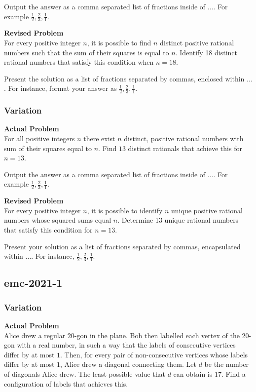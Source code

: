 Output the answer as a comma separated list of fractions inside of $\boxed{...}$. For example $\boxed{\frac{1}{2}, \frac{2}{3}, \frac{1}{1}}$.

\textbf{Revised Problem}\\
For every positive integer $n$, it is possible to find $n$ distinct positive rational numbers such that the sum of their squares is equal to $n$. Identify 18 distinct rational numbers that satisfy this condition when $n = 18$.

Present the solution as a list of fractions separated by commas, enclosed within $\boxed{...}$. For instance, format your answer as $\boxed{\frac{1}{2}, \frac{2}{3}, \frac{1}{1}}$.

\subsubsection{Variation}
\textbf{Actual Problem}\\
For all positive integers $n$ there exist $n$ distinct, positive rational numbers with sum of their squares equal to $n$. Find $13$ distinct rationals that achieve this for $n = 13$.

Output the answer as a comma separated list of fractions inside of $\boxed{...}$. For example $\boxed{\frac{1}{2}, \frac{2}{3}, \frac{1}{1}}$.

\textbf{Revised Problem}\\
For every positive integer \( n \), it is possible to identify \( n \) unique positive rational numbers whose squared sums equal \( n \). Determine 13 unique rational numbers that satisfy this condition for \( n = 13 \).

Present your solution as a list of fractions separated by commas, encapsulated within $\boxed{...}$. For instance, $\boxed{\frac{1}{2}, \frac{2}{3}, \frac{1}{1}}$.

\subsection{emc-2021-1}
\subsubsection{Variation}
\textbf{Actual Problem}\\
Alice drew a regular $20$-gon in the plane. Bob then labelled each vertex of the $20$-gon with a real number, in such a way that the labels of consecutive vertices differ by at most $1$. Then, for every pair of non-consecutive vertices whose labels differ by at most $1$, Alice drew a diagonal connecting them. Let $d$ be the number of diagonals Alice drew. The least possible value that $d$ can obtain is $17$. Find a configuration of labels that achieves this.

